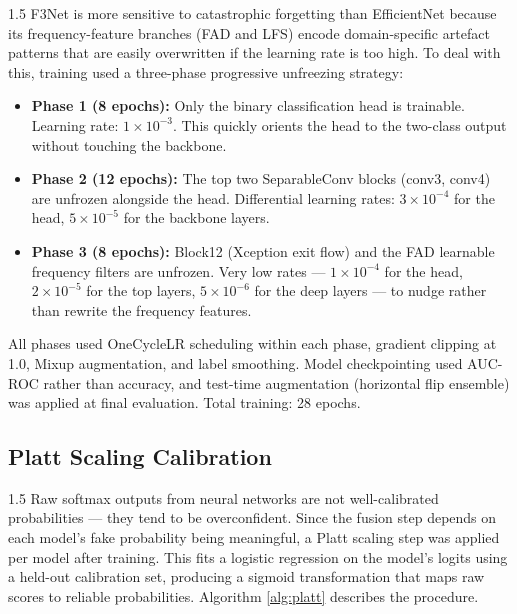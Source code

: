 \begin{spacing}{1.5}
F3Net is more sensitive to catastrophic forgetting than EfficientNet because its frequency-feature branches (FAD and LFS) encode domain-specific artefact patterns that are easily overwritten if the learning rate is too high. To deal with this, training used a three-phase progressive unfreezing strategy:

\begin{itemize}
  \item \textbf{Phase 1 (8 epochs):} Only the binary classification head is trainable. Learning rate: $1 \times 10^{-3}$. This quickly orients the head to the two-class output without touching the backbone.
  \item \textbf{Phase 2 (12 epochs):} The top two SeparableConv blocks (conv3, conv4) are unfrozen alongside the head. Differential learning rates: $3 \times 10^{-4}$ for the head, $5 \times 10^{-5}$ for the backbone layers.
  \item \textbf{Phase 3 (8 epochs):} Block12 (Xception exit flow) and the FAD learnable frequency filters are unfrozen. Very low rates --- $1 \times 10^{-4}$ for the head, $2 \times 10^{-5}$ for the top layers, $5 \times 10^{-6}$ for the deep layers --- to nudge rather than rewrite the frequency features.
\end{itemize}

All phases used OneCycleLR scheduling within each phase, gradient clipping at 1.0, Mixup augmentation, and label smoothing. Model checkpointing used AUC-ROC rather than accuracy, and test-time augmentation (horizontal flip ensemble) was applied at final evaluation. Total training: 28 epochs.
\end{spacing}

\subsection{Platt Scaling Calibration}

\begin{spacing}{1.5}
Raw softmax outputs from neural networks are not well-calibrated probabilities --- they tend to be overconfident. Since the fusion step depends on each model's fake probability being meaningful, a Platt scaling step was applied per model after training. This fits a logistic regression on the model's logits using a held-out calibration set, producing a sigmoid transformation that maps raw scores to reliable probabilities. Algorithm \ref{alg:platt} describes the procedure.
\end{spacing}

